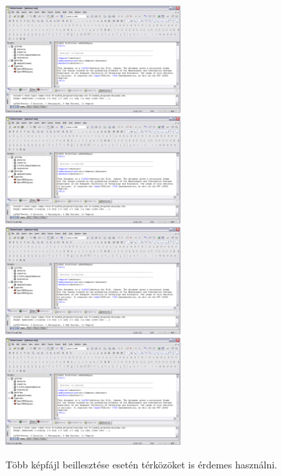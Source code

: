 \begin{figure}[!ht]
\centering
\includegraphics[width=67mm, keepaspectratio]{figures/TeXnicCenter.png}\hspace{1cm}
\includegraphics[width=67mm, keepaspectratio]{figures/TeXnicCenter.png}\\\vspace{5mm}
\includegraphics[width=67mm, keepaspectratio]{figures/TeXnicCenter.png}\hspace{1cm}
\includegraphics[width=67mm, keepaspectratio]{figures/TeXnicCenter.png}
\caption{Több képfájl beillesztése esetén térközöket is érdemes használni.} 
\label{fig:HVSpaces}
\end{figure}

